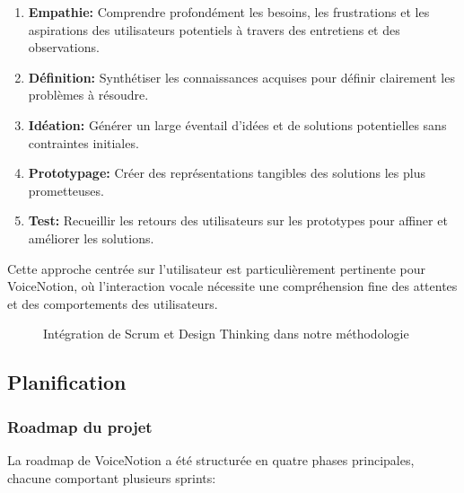 \begin{enumerate}
    \item \textbf{Empathie:} Comprendre profondément les besoins, les frustrations et les aspirations des utilisateurs potentiels à travers des entretiens et des observations.
    
    \item \textbf{Définition:} Synthétiser les connaissances acquises pour définir clairement les problèmes à résoudre.
    
    \item \textbf{Idéation:} Générer un large éventail d'idées et de solutions potentielles sans contraintes initiales.
    
    \item \textbf{Prototypage:} Créer des représentations tangibles des solutions les plus prometteuses.
    
    \item \textbf{Test:} Recueillir les retours des utilisateurs sur les prototypes pour affiner et améliorer les solutions.
\end{enumerate}

Cette approche centrée sur l'utilisateur est particulièrement pertinente pour VoiceNotion, où l'interaction vocale nécessite une compréhension fine des attentes et des comportements des utilisateurs.

\begin{figure}[H]
    \centering
    \caption{Intégration de Scrum et Design Thinking dans notre méthodologie}
    \label{fig:agile_design_thinking}
\end{figure}

\subsection{Planification}

\subsubsection{Roadmap du projet}

La roadmap de VoiceNotion a été structurée en quatre phases principales, chacune comportant plusieurs sprints:

